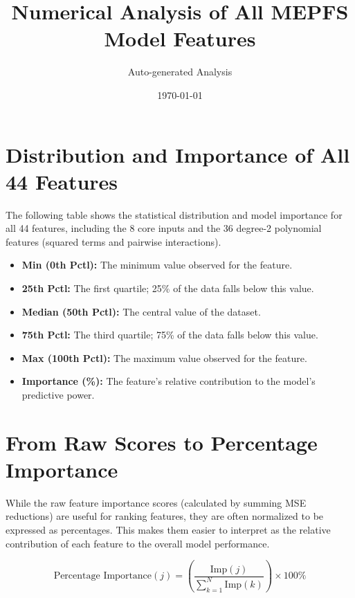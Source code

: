 \documentclass[11pt]{article}
\title{Numerical Analysis of All MEPFS Model Features}
\author{Auto-generated Analysis}
\date{\today}
\begin{document}
\maketitle

\section*{Distribution and Importance of All 44 Features}
The following table shows the statistical distribution and model importance for all 44 features, including the 8 core inputs and the 36 degree-2 polynomial features (squared terms and pairwise interactions).

\begin{itemize}
    \item \textbf{Min (0th Pctl):} The minimum value observed for the feature.
    \item \textbf{25th Pctl:} The first quartile; 25\% of the data falls below this value.
    \item \textbf{Median (50th Pctl):} The central value of the dataset.
    \item \textbf{75th Pctl:} The third quartile; 75\% of the data falls below this value.
    \item \textbf{Max (100th Pctl):} The maximum value observed for the feature.
    \item \textbf{Importance (\%):} The feature's relative contribution to the model's predictive power.
\end{itemize}

\section*{From Raw Scores to Percentage Importance}
While the raw feature importance scores (calculated by summing MSE reductions) are useful for ranking features, they are often normalized to be expressed as percentages.  
This makes them easier to interpret as the relative contribution of each feature to the overall model performance.

\[
\text{Percentage Importance}(j) = 
\left( \frac{\mathrm{Imp}(j)}{\sum_{k=1}^{N} \mathrm{Imp}(k)} \right) \times 100\%
\]
\end{document}
